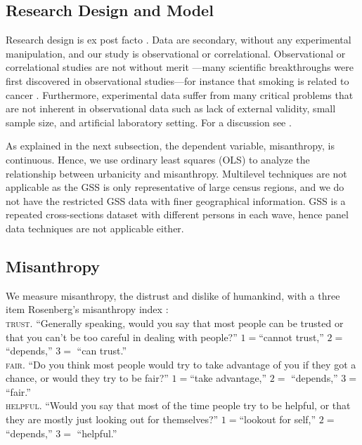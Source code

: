 \documentclass[11pt, letterpaper]{article}
\begin{document}
\begin{spacing}{1.4}
\subsection*{Research Design and Model}

Research design is  ex post facto \citep{mohr95}. Data are secondary,
without any experimental manipulation, and our study is observational or correlational.  
Observational or correlational studies are not
without merit%
---many scientific breakthroughs were first
discovered in observational studies---for instance that smoking is
related to cancer \citep[e.g.,][]{blanchflower11,oswald14}.
 Furthermore, experimental data %
 suffer from many critical problems that are not inherent in
observational data such as lack of external validity, small sample size, and  
artificial laboratory setting. %
For a discussion see \citet{pawson97}.

As explained in the next subsection, the dependent variable, misanthropy, is
continuous. Hence, we  use ordinary least squares (OLS) to analyze the
relationship between urbanicity and  misanthropy.
Multilevel techniques are not applicable  as the GSS is only representative of
large census regions, and we do not have the restricted GSS data with finer
geographical information.
 GSS is a repeated cross-sections dataset with different persons in each wave, hence
 panel data techniques are not applicable either. 

\subsection*{Misanthropy}

We measure misanthropy, the distrust and dislike of humankind, with a three item  Rosenberg's  misanthropy index \citep{rosenberg56,smith97}:\\

\indent\textsc{trust}. ``Generally speaking, would you say that most people can be trusted or that you can't be too
careful in dealing with people?''  $1=$``cannot trust,'' $2=$     ``depends,'' $3=$   ``can trust.''\\
\indent\textsc{fair}. ``Do you think most people would try to take advantage of you if they got a chance, or
would they try to be fair?'' $1=$``take advantage,'' $2=$       ``depends,'' $3=$          ``fair.'' \\
\indent\textsc{helpful}. ``Would you say that most of the time people try to be helpful, or that they are mostly just
looking out for themselves?'' $1=$``lookout for self,'' $2=$       ``depends,'' $3=$        ``helpful.''\\ 


\end{spacing}
\end{document}
